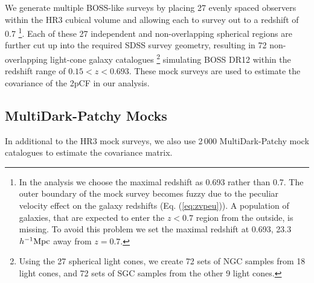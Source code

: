 \documentclass[iop]{emulateapj}
\begin{document}


We generate multiple BOSS-like surveys by placing 27 evenly spaced
observers within the HR3 cubical volume and allowing each to 
survey out to a redshift of 0.7
\footnote{In the analysis we choose the maximal redshift as 0.693 rather than 0.7. 
The outer boundary of the mock survey becomes fuzzy due to the peculiar velocity effect 
on the galaxy redshifts (Eq. (\ref{eq:zvpeu})).
A population of galaxies, that are expected to enter the $z<0.7$ region from the outside, is missing.
To avoid this problem we set the maximal redshift at 0.693, 
23.3 $h^{-1}{\rm Mpc}$ away from $z=0.7$.}.
Each of these 27 independent and non-overlapping spherical 
regions are further cut up into the required SDSS survey geometry,
resulting in 72 non-overlapping light-cone galaxy catalogues 
\footnote{Using the 27 spherical light cones, we create 72 sets of NGC samples from 18 light cones, 
and 72 sets of SGC samples from the other 9 light cones.}
simulating BOSS DR12 within the redshift range of $0.15< z< 0.693$.
These mock surveys are used to estimate the covariance of the 2pCF in our analysis.

\subsection{MultiDark-Patchy Mocks}

In additional to the HR3 mock surveys, 
we also use 2\,000 MultiDark-Patchy mock catalogues \citep{Kitaura2014,MDPATCHY} to estimate the covariance matrix.
\end{document}
